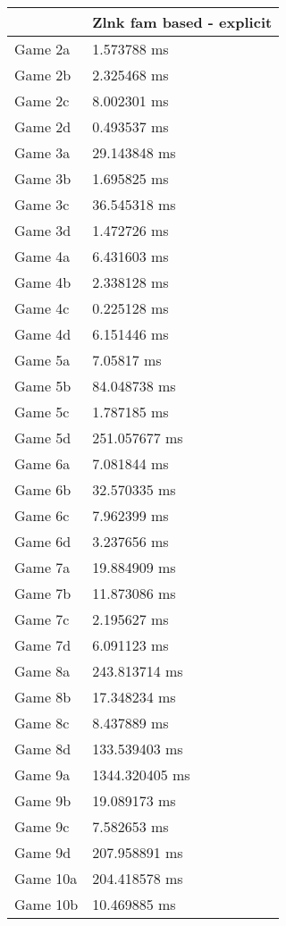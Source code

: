 \begin{tabular}{|l|l|}
	\hline
	& Zlnk fam based - explicit \\ \hline
	Game 2a & 1.573788 ms \\ \hline
	Game 2b & 2.325468 ms \\ \hline
	Game 2c & 8.002301 ms \\ \hline
	Game 2d & 0.493537 ms \\ \hline
	Game 3a & 29.143848 ms \\ \hline
	Game 3b & 1.695825 ms \\ \hline
	Game 3c & 36.545318 ms \\ \hline
	Game 3d & 1.472726 ms \\ \hline
	Game 4a & 6.431603 ms \\ \hline
	Game 4b & 2.338128 ms \\ \hline
	Game 4c & 0.225128 ms \\ \hline
	Game 4d & 6.151446 ms \\ \hline
	Game 5a & 7.05817 ms \\ \hline
	Game 5b & 84.048738 ms \\ \hline
	Game 5c & 1.787185 ms \\ \hline
	Game 5d & 251.057677 ms \\ \hline
	Game 6a & 7.081844 ms \\ \hline
	Game 6b & 32.570335 ms \\ \hline
	Game 6c & 7.962399 ms \\ \hline
	Game 6d & 3.237656 ms \\ \hline
	Game 7a & 19.884909 ms \\ \hline
	Game 7b & 11.873086 ms \\ \hline
	Game 7c & 2.195627 ms \\ \hline
	Game 7d & 6.091123 ms \\ \hline
	Game 8a & 243.813714 ms \\ \hline
	Game 8b & 17.348234 ms \\ \hline
	Game 8c & 8.437889 ms \\ \hline
	Game 8d & 133.539403 ms \\ \hline
	Game 9a & 1344.320405 ms \\ \hline
	Game 9b & 19.089173 ms \\ \hline
	Game 9c & 7.582653 ms \\ \hline
	Game 9d & 207.958891 ms \\ \hline
	Game 10a & 204.418578 ms \\ \hline
	Game 10b & 10.469885 ms \\ \hline

\end{tabular}
